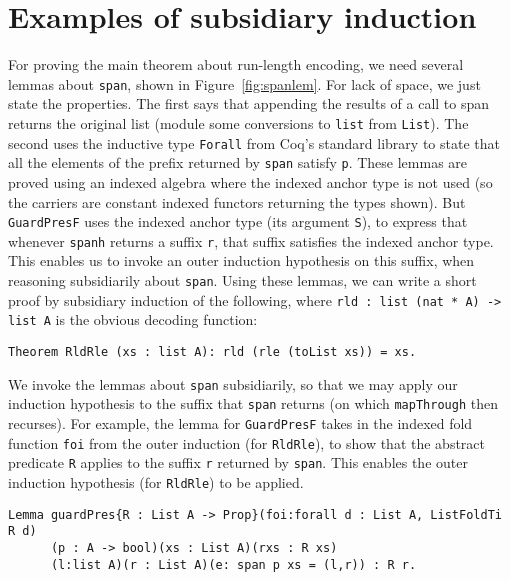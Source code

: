 \documentclass[a4paper,USenglish]{lipics-v2021}
\begin{document}
\section{Examples of subsidiary induction}
\label{sec:examplesi}

For proving the main theorem about run-length encoding, we need
several lemmas about \verb|span|, shown in Figure~\ref{fig:spanlem}.
For lack of space, we just state the properties.  The first says that
appending the results of a call to span returns the original list
(module some conversions to \verb|list| from \verb|List|).  The second
uses the inductive type \verb|Forall| from Coq's standard library to
state that all the elements of the prefix returned by \verb|span|
satisfy \verb|p|.  These lemmas are proved using an indexed algebra
where the indexed anchor type is not used (so the carriers are
constant indexed functors returning the types shown).  But
\verb|GuardPresF| uses the indexed anchor type (its argument \verb|S|),
to express that whenever \verb|spanh| returns a suffix \verb|r|, that
suffix satisfies the indexed anchor type.  This enables us to invoke
an outer induction hypothesis on this suffix, when reasoning
subsidiarily about \verb|span|.  Using these lemmas, we can write a short proof by
subsidiary induction of the following, where
\verb|rld : list (nat * A) -> list A| is the obvious decoding
function:

\begin{verbatim}
Theorem RldRle (xs : list A): rld (rle (toList xs)) = xs.  
\end{verbatim}

\noindent We invoke the lemmas about \verb|span| subsidiarily,
so that we may apply our induction hypothesis to the suffix
that \verb|span| returns (on which \verb|mapThrough| then recurses).
For example, the lemma for \verb|GuardPresF| takes in the
indexed fold function \verb|foi| from the outer induction (for \verb|RldRle|),
to show that the abstract predicate \verb|R| applies to the suffix
\verb|r| returned by \verb|span|.  This enables the outer induction
hypothesis (for \verb|RldRle|) to be applied.

\begin{verbatim}
Lemma guardPres{R : List A -> Prop}(foi:forall d : List A, ListFoldTi R d)
      (p : A -> bool)(xs : List A)(rxs : R xs)
      (l:list A)(r : List A)(e: span p xs = (l,r)) : R r.
\end{verbatim} 
\end{document}
